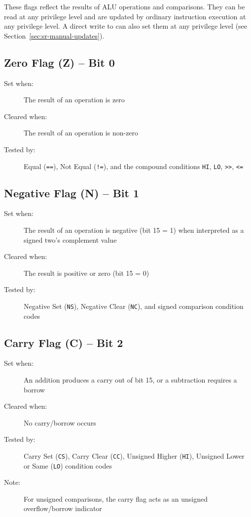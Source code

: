 These flags reflect the results of ALU operations and comparisons. They can be read at any privilege level and are
updated by ordinary instruction execution at any privilege level. A direct write to  can also set them at any
privilege level (see Section~\ref{sec:sr-manual-updates}).

\subsection{Zero Flag (Z) -- Bit 0}

\begin{description}
	\item[Set when:] The result of an operation is zero
	\item[Cleared when:] The result of an operation is non-zero
	\item[Tested by:] Equal (\texttt{==}), Not Equal (\texttt{!=}), and the compound conditions \texttt{HI}, \texttt{LO},
	      \texttt{>>}, \texttt{<=}
\end{description}

\subsection{Negative Flag (N) -- Bit 1}

\begin{description}
	\item[Set when:] The result of an operation is negative (bit 15 = 1) when interpreted as a signed two's complement value
	\item[Cleared when:] The result is positive or zero (bit 15 = 0)
	\item[Tested by:] Negative Set (\texttt{NS}), Negative Clear (\texttt{NC}), and signed comparison condition codes
\end{description}

\subsection{Carry Flag (C) -- Bit 2}

\begin{description}
	\item[Set when:] An addition produces a carry out of bit 15, or a subtraction requires a borrow
	\item[Cleared when:] No carry/borrow occurs
	\item[Tested by:] Carry Set (\texttt{CS}), Carry Clear (\texttt{CC}), Unsigned Higher (\texttt{HI}), Unsigned Lower or Same
	      (\texttt{LO}) condition codes
	\item[Note:] For unsigned comparisons, the carry flag acts as an unsigned overflow/borrow indicator
\end{description}

